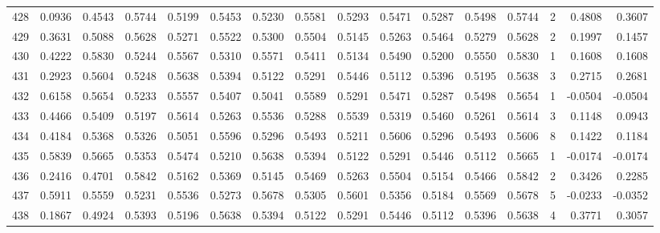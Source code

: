 \begin{tabular}{lrrrrrrrrrrrrrrr}
428 &      0.0936 &  0.4543 &  0.5744 &  0.5199 &  0.5453 &  0.5230 &  0.5581 &  0.5293 &  0.5471 &  0.5287 &   0.5498 &     0.5744 &      2 &                    0.4808 &                     0.3607 \\
429 &      0.3631 &  0.5088 &  0.5628 &  0.5271 &  0.5522 &  0.5300 &  0.5504 &  0.5145 &  0.5263 &  0.5464 &   0.5279 &     0.5628 &      2 &                    0.1997 &                     0.1457 \\
430 &      0.4222 &  0.5830 &  0.5244 &  0.5567 &  0.5310 &  0.5571 &  0.5411 &  0.5134 &  0.5490 &  0.5200 &   0.5550 &     0.5830 &      1 &                    0.1608 &                     0.1608 \\
431 &      0.2923 &  0.5604 &  0.5248 &  0.5638 &  0.5394 &  0.5122 &  0.5291 &  0.5446 &  0.5112 &  0.5396 &   0.5195 &     0.5638 &      3 &                    0.2715 &                     0.2681 \\
432 &      0.6158 &  0.5654 &  0.5233 &  0.5557 &  0.5407 &  0.5041 &  0.5589 &  0.5291 &  0.5471 &  0.5287 &   0.5498 &     0.5654 &      1 &                   -0.0504 &                    -0.0504 \\
433 &      0.4466 &  0.5409 &  0.5197 &  0.5614 &  0.5263 &  0.5536 &  0.5288 &  0.5539 &  0.5319 &  0.5460 &   0.5261 &     0.5614 &      3 &                    0.1148 &                     0.0943 \\
434 &      0.4184 &  0.5368 &  0.5326 &  0.5051 &  0.5596 &  0.5296 &  0.5493 &  0.5211 &  0.5606 &  0.5296 &   0.5493 &     0.5606 &      8 &                    0.1422 &                     0.1184 \\
435 &      0.5839 &  0.5665 &  0.5353 &  0.5474 &  0.5210 &  0.5638 &  0.5394 &  0.5122 &  0.5291 &  0.5446 &   0.5112 &     0.5665 &      1 &                   -0.0174 &                    -0.0174 \\
436 &      0.2416 &  0.4701 &  0.5842 &  0.5162 &  0.5369 &  0.5145 &  0.5469 &  0.5263 &  0.5504 &  0.5154 &   0.5466 &     0.5842 &      2 &                    0.3426 &                     0.2285 \\
437 &      0.5911 &  0.5559 &  0.5231 &  0.5536 &  0.5273 &  0.5678 &  0.5305 &  0.5601 &  0.5356 &  0.5184 &   0.5569 &     0.5678 &      5 &                   -0.0233 &                    -0.0352 \\
438 &      0.1867 &  0.4924 &  0.5393 &  0.5196 &  0.5638 &  0.5394 &  0.5122 &  0.5291 &  0.5446 &  0.5112 &   0.5396 &     0.5638 &      4 &                    0.3771 &                     0.3057 \\

\end{tabular}
